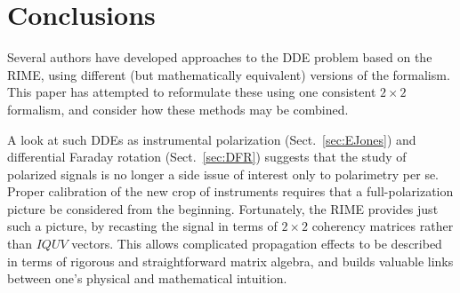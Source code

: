 \documentclass{aa}
\newcommand{\EDIT}[1]{#1}
\begin{document}
\section{Conclusions}
\EDIT{
Several authors have developed approaches to the DDE problem based on the RIME, using different (but mathematically equivalent) versions of the formalism. This paper has attempted to reformulate these using one consistent $2\times2$ formalism, and consider how these methods may be combined. 

A look at such DDEs as instrumental polarization (Sect.~\ref{sec:EJones}) and differential Faraday rotation (Sect.~\ref{sec:DFR}) suggests that the study of polarized signals is no longer a side issue of interest only to polarimetry per se. Proper calibration of the new crop of instruments requires that a full-polarization picture be considered from the beginning. Fortunately, the RIME provides just such a picture, by recasting the signal in terms of $2\times2$ coherency matrices rather than $IQUV$ vectors. This allows complicated propagation effects to be described in terms of rigorous and straightforward matrix algebra, and builds valuable links between one's physical and mathematical intuition. 
}




\end{document}
